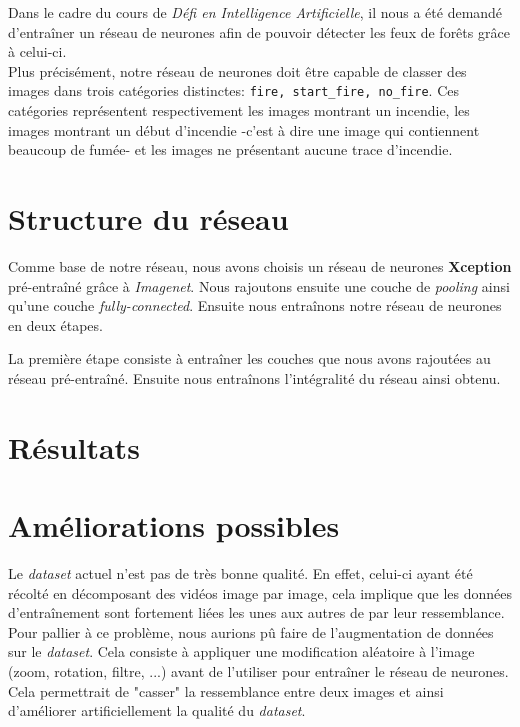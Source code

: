 \documentclass[10pt,a4paper]{article}
\begin{document}
   		Dans le cadre du cours de \textit{Défi en Intelligence Artificielle}, il nous a été demandé d'entraîner un réseau de neurones afin de pouvoir détecter les feux de forêts grâce à celui-ci.\\
   		Plus précisément, notre réseau de neurones doit être capable de classer des images dans trois catégories distinctes: \texttt{fire, start\_fire, no\_fire}. Ces catégories représentent respectivement les images montrant un incendie, les images montrant un début d'incendie -c'est à dire une image qui contiennent beaucoup de fumée- et les images ne présentant aucune trace d'incendie.
   		
   	\section{Structure du réseau}
   	
   		Comme base de notre réseau, nous avons choisis un réseau de neurones \textbf{Xception} pré-entraîné grâce à \textit{Imagenet}. Nous rajoutons ensuite une couche de \textit{pooling} ainsi qu'une couche \textit{fully-connected}. Ensuite nous entraînons notre réseau de neurones en deux étapes. 
   		
   		La première étape consiste à entraîner les couches que nous avons rajoutées au réseau pré-entraîné. Ensuite nous entraînons l'intégralité du réseau ainsi obtenu.
   	
   	\section{Résultats}
   	
   	\section{Améliorations possibles}
   	
   		Le \textit{dataset} actuel n'est pas de très bonne qualité. En effet, celui-ci ayant été récolté en décomposant des vidéos image par image, cela implique que les données d'entraînement sont fortement liées les unes aux autres de par leur ressemblance. Pour pallier à ce problème, nous aurions pû faire de l'augmentation de données sur le \textit{dataset}. Cela consiste à appliquer une modification aléatoire à l'image (zoom, rotation, filtre, ...) avant de l'utiliser pour entraîner le réseau de neurones. Cela permettrait de "casser" la ressemblance entre deux images et ainsi d'améliorer artificiellement la qualité du \textit{dataset}.
   	
   	\newpage
          	
\end{document}
